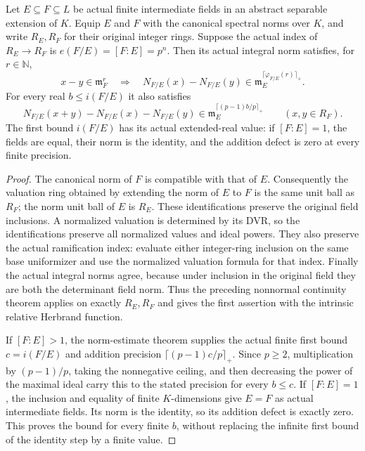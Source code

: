 \begin{lemma}
\label{fw:finite-layer-norm-precision}
\leanok
Let $E\subseteq F\subseteq L$ be actual finite intermediate fields
in an abstract separable extension of $K$. Equip $E$ and $F$ with
the canonical spectral norms over $K$, and write $R_E,R_F$ for
their original integer rings. Suppose the actual index of
$R_E\longrightarrow R_F$ is $e(F/E)=[F:E]=p^n$.
Then its actual integral norm satisfies, for $r\in\mathbb N$,
\[
 x-y\in\mathfrak m_F^r\quad\Longrightarrow\quad
 N_{F/E}(x)-N_{F/E}(y)\in
 \mathfrak m_E^{\lceil\varphi_{F/E}(r)\rceil_+}.
\]
For every real $b\leq i(F/E)$ it also satisfies
\[
 N_{F/E}(x+y)-N_{F/E}(x)-N_{F/E}(y)
 \in\mathfrak m_E^{\lceil(p-1)b/p\rceil_+}
 \qquad(x,y\in R_F).
\]
The first bound $i(F/E)$ has its actual extended-real value:
if $[F:E]=1$, the fields are equal, their norm is the identity,
and the addition defect is zero at every finite precision.
\end{lemma}
\begin{proof}
The canonical norm of $F$ is compatible with that of $E$.
Consequently the valuation ring obtained by extending the norm of
$E$ to $F$ is the same unit ball as $R_F$; the norm unit ball of
$E$ is $R_E$. These identifications preserve the original field
inclusions. A normalized valuation is determined by its DVR,
so the identifications preserve all normalized values and ideal powers.
They also preserve the actual ramification index: evaluate either
integer-ring inclusion on the same base uniformizer and use the
normalized valuation formula for that index.
Finally the actual integral norms agree, because under inclusion
in the original field they are both the determinant field norm.
Thus the preceding nonnormal continuity theorem applies on exactly
$R_E,R_F$ and gives the first assertion with the intrinsic relative
Herbrand function.

If $[F:E]>1$, the norm-estimate theorem supplies the actual finite
first bound $c=i(F/E)$ and addition precision
$\lceil(p-1)c/p\rceil_+$. Since $p\geq2$, multiplication by
$(p-1)/p$, taking the nonnegative ceiling, and then decreasing the
power of the maximal ideal carry this to the stated precision for
every $b\leq c$. If $[F:E]=1$, the inclusion and equality of finite
$K$-dimensions give $E=F$ as actual intermediate fields.
Its norm is the identity, so its addition defect is exactly zero.
This proves the bound for every finite $b$, without replacing the
infinite first bound of the identity step by a finite value.
\end{proof}

